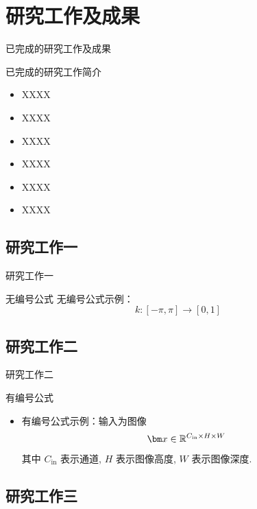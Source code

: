 \documentclass{beamer}
\begin{document}
\section{研究工作及成果}

\begin{frame}{已完成的研究工作及成果}
  \begin{block}{已完成的研究工作简介}
    \begin{itemize}
      \setlength{\itemsep}{6pt}
      \item XXXX
      \item XXXX
      \item XXXX
      \item XXXX
      \item XXXX
      \item XXXX
    \end{itemize}
  \end{block}
\end{frame}

\subsection{研究工作一}

\begin{frame}{研究工作一}
  \begin{block}{无编号公式}
    无编号公式示例：
    $$
      k:[-\pi,\pi] \rightarrow [0,1]
    $$
  \end{block}
\end{frame}

\subsection{研究工作二}

\begin{frame}{研究工作二}
  \begin{block}{有编号公式}
    \begin{itemize}
      \item 有编号公式示例：输入为图像 
      \begin{equation}
        \vx\in\reals^{C_{\text{in}}\times H\times W}
      \end{equation}
      其中 $C_{\text{in}}$ 表示通道, $H$ 表示图像高度, $W$ 表示图像深度.
    \end{itemize}
  \end{block}
\end{frame}

\subsection{研究工作三}
\end{document}
